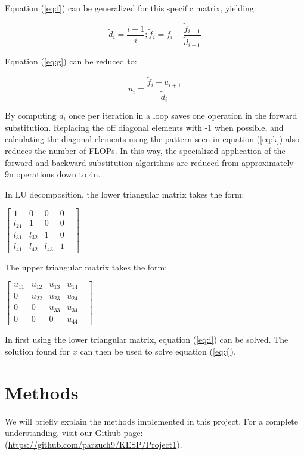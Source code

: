 \documentclass[10pt,showpacs,preprintnumbers,footinbib,amsmath,amssymb,aps,prl,twocolumn,groupedaddress,superscriptaddress,showkeys]{revtex4-1}
\begin{document}
Equation (\ref{eq:f}) can be generalized for this specific matrix, yielding: 

	\begin{equation}
        \label{eq:k}
	\tilde{d}_{i}=\frac{i+1}{i};  
	\tilde{f}_{i}=f_{i}+\frac{\tilde{f}_{i-1}}{\tilde{d}_{i-1}}
	\end{equation}

Equation (\ref{eq:g}) can be reduced to:

	\begin{equation}
	u_{i} = \frac{\tilde{f}_{i}+u_{i+1}}{\tilde{d}_{i}}
	\end{equation}

By computing $d_{i}$ once per iteration in a loop saves one operation in the forward substitution. Replacing the off diagonal elements with -1 when possible, and calculating the diagonal elements using the pattern seen in equation (\ref{eq:k}) also reduces the number of FLOPs. In this way, the specialized application of the forward and backward substitution algorithms are reduced from approximately 9n operations down to 4n.

In LU decomposition, the lower triangular matrix takes the form:
\begin{center}
$\begin{bmatrix}
			1 & 0 & 0 & 0 \\
			l_{21} & 1 & 0 & 0 & \\
			l_{31} &l_{32}& 1 & 0   \\
			l_{41}&l_{42}&l_{43}& 1 
\end{bmatrix}$
\end{center}
The upper triangular matrix takes the form:
\begin{center}
$\begin{bmatrix}
			u_{11}&u_{12}&u_{13}&u_{14}\\
			0 & u_{22} & u_{23}& u_{24} & \\
			0 & 0 & u_{33} & u_{34}   \\
			0 & 0 & 0 & u_{44}
\end{bmatrix}$
\end{center}
In first using the lower triangular matrix, equation (\ref{eq:i}) can be solved. The solution found for $x$ can then be used to solve equation (\ref{eq:j}).
\section{Methods}
We will briefly explain the methods implemented in this project. For a complete understanding, visit our Github page: (\url{https://github.com/parzuch9/KESP/Project1}).
\end{document}
